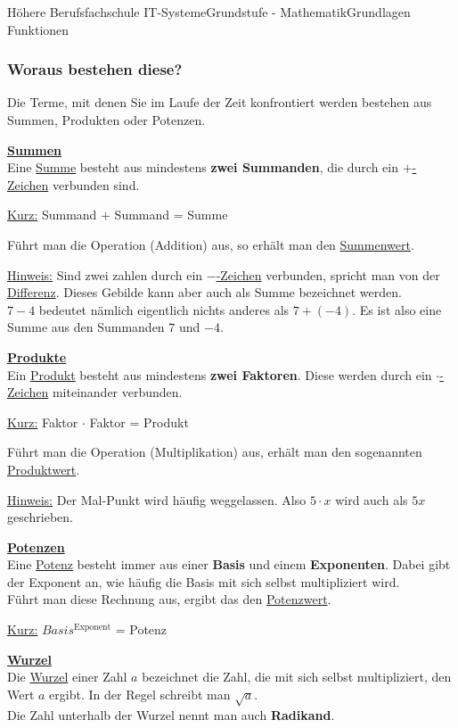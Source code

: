 \documentclass[11pt,twocolumn,oneside,openany,headings=optiontotoc,11pt,numbers=noenddot]{article}
\begin{document}
\begin{worksheet}{Höhere Berufsfachschule IT-Systeme}{Grundstufe - Mathematik}{Grundlagen Funktionen}
		\subsubsection*{Woraus bestehen diese?}
		Die Terme, mit denen Sie im Laufe der Zeit konfrontiert werden bestehen aus Summen, Produkten oder Potenzen.\\
		\par\noindent
		\textbf{\underline{Summen}}\\
		Eine \underline{Summe} besteht aus mindestens \textbf{zwei Summanden}, die durch ein \underline{\(+\)-Zeichen} verbunden sind.
		\begin{framed}\noindent
			\underline{Kurz:} Summand + Summand = Summe
		\end{framed}
		\noindent
		Führt man die Operation (Addition) aus, so erhält man den \underline{Summenwert}.\\
		\par\noindent
		\underline{Hinweis:} Sind zwei zahlen durch ein \underline{\glqq{}\(-\)\grqq{}-Zeichen} verbunden, spricht man von der \underline{Differenz}. Dieses Gebilde kann aber auch als Summe bezeichnet werden.\\
		\(7-4\) bedeutet nämlich eigentlich nichts anderes als \(7 + (-4)\). Es ist also eine Summe aus den Summanden \(7\) und \(-4\).\\
		\par\noindent
		\textbf{\underline{Produkte}}\\
		Ein \underline{Produkt} besteht aus mindestens \textbf{zwei Faktoren}. Diese werden durch ein \underline{\glqq{}\(\cdot\)\grqq{}-Zeichen} miteinander verbunden.
		\begin{framed}
			\noindent
			\underline{Kurz:} Faktor $\cdot$ Faktor = Produkt
		\end{framed}
		\noindent
		Führt man die Operation (Multiplikation) aus, erhält man den sogenannten \underline{Produktwert}.\\
		\par\noindent
		\underline{Hinweis:} Der Mal-Punkt wird häufig weggelassen. Also \(5\cdot x\) wird auch als \(5x\) geschrieben.\\
		\par\noindent
		\textbf{\underline{Potenzen}}\\
		Eine \underline{Potenz} besteht immer aus einer \textbf{Basis} und einem \textbf{Exponenten}. Dabei gibt der Exponent an, wie häufig die Basis mit sich selbst multipliziert wird.\\
		Führt man diese Rechnung aus, ergibt das den \underline{Potenzwert}.
		\begin{framed}
			\noindent
			\underline{Kurz:} \(Basis^{\text{Exponent}}\) = Potenz
		\end{framed}
		\noindent
		\underline{\textbf{Wurzel}}\\
		Die \underline{Wurzel} einer Zahl \(a\) bezeichnet die Zahl, die mit sich selbst multipliziert, den Wert \(a\) ergibt. In der Regel schreibt man \(\sqrt{a}\).\\
		Die Zahl unterhalb der Wurzel nennt man auch \textbf{Radikand}.

\end{worksheet}
\end{document}

